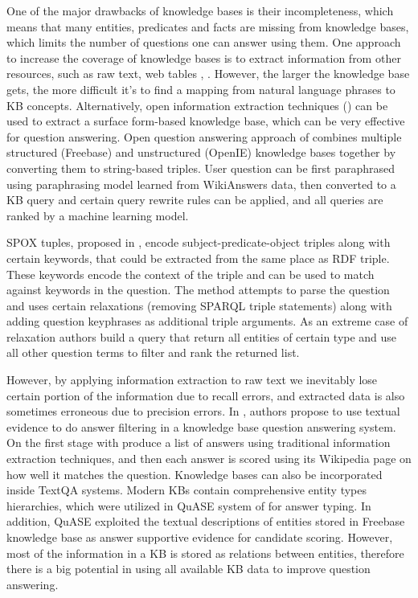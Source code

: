 One of the major drawbacks of knowledge bases is their incompleteness, which means that many entities, predicates and facts are missing from knowledge bases, which limits the number of questions one can answer using them.
One approach to increase the coverage of knowledge bases is to extract information from other resources, such as raw text\cite{MintzBSJ09,jijkoun2004information,Gupta:2014:BOS:2732286.2732288}, web tables \cite{Cafarella:2008:WEP:1453856.1453916}, \etc.
However, the larger the knowledge base gets, the more difficult it's to find a mapping from natural language phrases to KB concepts.
Alternatively, open information extraction techniques (\cite{Etzioni:2008:OIE:1409360.1409378}) can be used to extract a surface form-based knowledge base, which can be very effective for question answering.
Open question answering approach of \cite{Fader:2014:OQA:2623330.2623677} combines multiple structured (Freebase) and unstructured (OpenIE) knowledge bases together by converting them to string-based triples.
User question can be first paraphrased using paraphrasing model learned from WikiAnswers data, then converted to a KB query and certain query rewrite rules can be applied, and all queries are ranked by a machine learning model.

SPOX tuples, proposed in \cite{yahya2013robust}, encode subject-predicate-object triples along with certain keywords, that could be extracted from the same place as RDF triple.
These keywords encode the context of the triple and can be used to match against keywords in the question. The method attempts to parse the question and uses certain relaxations (removing SPARQL triple statements) along with adding question keyphrases as additional triple arguments.
As an extreme case of relaxation authors build a query that return all entities of certain type and use all other question terms to filter and rank the returned list.

However, by applying information extraction to raw text we inevitably lose certain portion of the information due to recall errors, and extracted data is also sometimes erroneous due to precision errors.
In \cite{xu2016enhancing}, authors propose to use textual evidence to do answer filtering in a knowledge base question answering system.
On the first stage with produce a list of answers using traditional information extraction techniques, and then each answer is scored using its Wikipedia page on how well it matches the question. 
Knowledge bases can also be incorporated inside TextQA systems.
Modern KBs contain comprehensive entity types hierarchies, which were utilized in QuASE system of \cite{Sun:2015:ODQ:2736277.2741651} for answer typing.
In addition, QuASE exploited the textual descriptions of entities stored in Freebase knowledge base as answer supportive evidence for candidate scoring.
However, most of the information in a KB is stored as relations between entities, therefore there is a big potential in using all available KB data to improve question answering.

